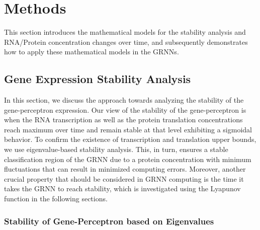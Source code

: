 \documentclass[twocolumn]{biophys-new}
\newcommand{\sm}[1]{\textcolor{brown}{#1}}
\begin{document}
{{%
\section*{Methods}
This section introduces the mathematical models for the stability analysis and RNA/Protein concentration changes over time,  and subsequently demonstrates  how to apply these mathematical models in the GRNNs. 
\subsection*{Gene Expression Stability Analysis} \label{method_stability_analysis}
\vspace{0.3em}

In this section, we discuss the approach towards analyzing the stability of the gene-perceptron expression. %
Our view of the stability of the gene-perceptron is when the RNA transcription as well as the protein translation concentrations reach maximum over time and remain stable at that level exhibiting a sigmoidal behavior. To confirm the existence of transcription and translation upper bounds, we use eigenvalue-based stability analysis. This, in turn, ensures a stable classification region of the GRNN due to a protein concentration with minimum fluctuations that can result in minimized computing errors. Moreover, another crucial property that should be considered in GRNN computing is the time it takes the GRNN to reach stability, which is investigated using the Lyapunov function in the following sections.

\subsubsection*{Stability of  Gene-Perceptron based on Eigenvalues}

}}
\end{document}
